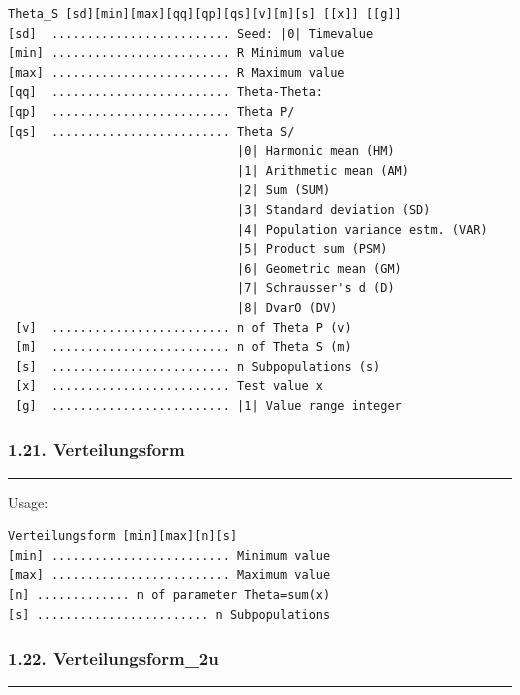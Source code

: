 \documentclass[
]{article}
\begin{document}
\begin{verbatim}
Theta_S [sd][min][max][qq][qp][qs][v][m][s] [[x]] [[g]]
[sd]  ......................... Seed: |0| Timevalue
[min] ......................... R Minimum value
[max] ......................... R Maximum value
[qq]  ......................... Theta-Theta:
[qp]  ......................... Theta P/
[qs]  ......................... Theta S/
                                |0| Harmonic mean (HM)
                                |1| Arithmetic mean (AM)
                                |2| Sum (SUM)
                                |3| Standard deviation (SD)
                                |4| Population variance estm. (VAR)
                                |5| Product sum (PSM)
                                |6| Geometric mean (GM)
                                |7| Schrausser's d (D)
                                |8| DvarO (DV)
 [v]  ......................... n of Theta P (v)
 [m]  ......................... n of Theta S (m)
 [s]  ......................... n Subpopulations (s)
 [x]  ......................... Test value x
 [g]  ......................... |1| Value range integer
\end{verbatim}

\hypertarget{verteilungsform}{%
\subsubsection{1.21. Verteilungsform}\label{verteilungsform}}

\begin{center}\rule{0.5\linewidth}{0.5pt}\end{center}

Usage:

\begin{verbatim}
Verteilungsform [min][max][n][s]
[min] ......................... Minimum value
[max] ......................... Maximum value
[n] ............. n of parameter Theta=sum(x)
[s] ........................ n Subpopulations
\end{verbatim}

\hypertarget{verteilungsform_2u}{%
\subsubsection{1.22. Verteilungsform\_2u}\label{verteilungsform_2u}}

\begin{center}\rule{0.5\linewidth}{0.5pt}\end{center}
\end{document}
